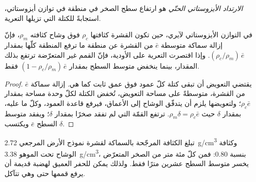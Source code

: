 \begin{definition}\label{def:b3:quantitative-geomorphology:rebound}
\emph{الارتداد الأيزوستاتي الحتّي} هو
ارتفاع سطح الصخر في منطقة في توازن أيزوستاتي،
استجابةً للكتلة التي تزيلها التعرية.
\end{definition}

\begin{proposition}\label{prop:b3:quantitative-geomorphology:rebound}
في التوازن الأيزوستاتي لآيري، حين تكون القشرة كثافتها $\rho_c$ فوق وشاح كثافته $\rho_m$،
فإنّ إزالة سماكة متوسطة $\bar e$ من القشرة عن منطقة ما ترفع المنطقة
كلّها بمقدار $(\rho_c/\rho_m)\,\bar e$. وإذا اقتصرت التعرية
على الأودية، فإنّ القمم غير المتعرّضة ترتفع بذلك المقدار، بينما
ينخفض متوسط السطح بمقدار $(1 - \rho_c/\rho_m)\,\bar e$ فقط.
\end{proposition}

\begin{proof}
يقتضي التعويض أن تبقى كتلة كلّ عمود فوق عمق ثابت
كما هي. إزالة سماكة $\bar e$ من القشرة، متوسطةً على مساحة
التعويض، تُخفض الكتلة لكلّ وحدة مساحة بمقدار $\rho_c \bar e$؛
ولتعويضها يلزم أن يتدفّق الوشاح إلى الأعماق، فيرفع قاعدة العمود،
وكلّ ما عليه، بمقدار $\delta$ حيث $\rho_m \delta = \rho_c \bar
e$. ترتفع القمّة التي لم تفقد صخرًا بمقدار $\delta$؛ ويفقد متوسط السطح
$\bar e$ ويكتسب $\delta$.
\end{proof}

تبلغ الكثافة المرجّحة بالسماكة لقشرة نموذج الأرض المرجعي
\qty{2.72}{g/cm^3} وكثافة الوشاح تحت الموهو \qty{3.38}{g/cm^3}،
بنسبة 0.80: فمن كلّ مئة متر من الصخر المتعرّض يخسر متوسط السطح
عشرين مترًا فقط. ولذلك يمكن للحفر العميق لهضبة قديمة أن يرفع قممها
حتى وهي تتآكل.

